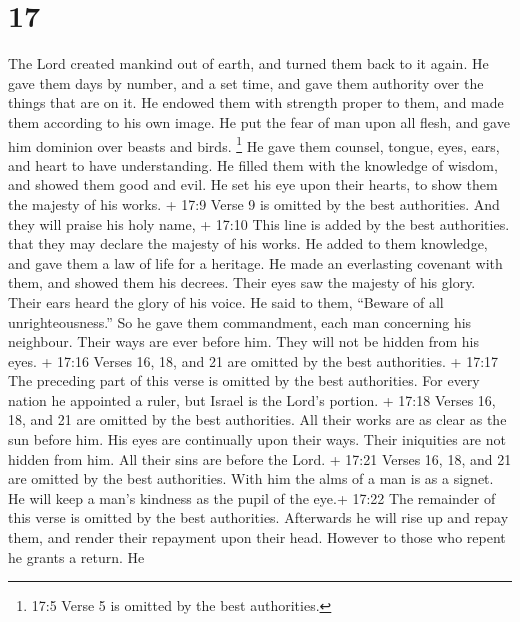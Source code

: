 \hypertarget{section-13}{%
\section{17}\label{section-13}}

 The Lord created mankind out of earth, and turned them back
to it again.  He gave them days by number, and a set time,
and gave them authority over the things that are on it.  He
endowed them with strength proper to them, and made them according to
his own image.  He put the fear of man upon all flesh, and
gave him dominion over beasts and birds.  \footnote{17:5
  Verse 5 is omitted by the best authorities.}  He gave them
counsel, tongue, eyes, ears, and heart to have understanding.
 He filled them with the knowledge of wisdom, and showed
them good and evil.  He set his eye upon their hearts, to
show them the majesty of his works.  + 17:9 Verse 9 is
omitted by the best authorities.  And they will praise his
holy name, + 17:10 This line is added by the best authorities. that they
may declare the majesty of his works.  He added to them
knowledge, and gave them a law of life for a heritage.  He
made an everlasting covenant with them, and showed them his decrees.
 Their eyes saw the majesty of his glory. Their ears heard
the glory of his voice.  He said to them, ``Beware of all
unrighteousness.'' So he gave them commandment, each man concerning his
neighbour.  Their ways are ever before him. They will not
be hidden from his eyes.  + 17:16 Verses 16, 18, and 21 are
omitted by the best authorities.  + 17:17 The preceding
part of this verse is omitted by the best authorities. For every nation
he appointed a ruler, but Israel is the Lord's portion.  +
17:18 Verses 16, 18, and 21 are omitted by the best authorities.
 All their works are as clear as the sun before him. His
eyes are continually upon their ways.  Their iniquities are
not hidden from him. All their sins are before the Lord.  +
17:21 Verses 16, 18, and 21 are omitted by the best authorities.
 With him the alms of a man is as a signet. He will keep a
man's kindness as the pupil of the eye.+ 17:22 The remainder of this
verse is omitted by the best authorities.  Afterwards he
will rise up and repay them, and render their repayment upon their head.
 However to those who repent he grants a return. He
